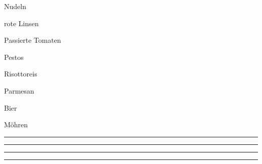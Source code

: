 
\begin{ONEitemize}

    \item{Nudeln}
    \item{rote Linsen}
    \item{Passierte Tomaten}
    \item{Pestos}

    \item{Risottoreis}
    \item{Parmesan}

    \item{Bier}
    \item{Möhren}

    \item{\rule{50mm}{0.4pt}}
    \item{\rule{50mm}{0.4pt}}
    \item{\rule{50mm}{0.4pt}}
    \item{\rule{50mm}{0.4pt}}

\end{ONEitemize}

